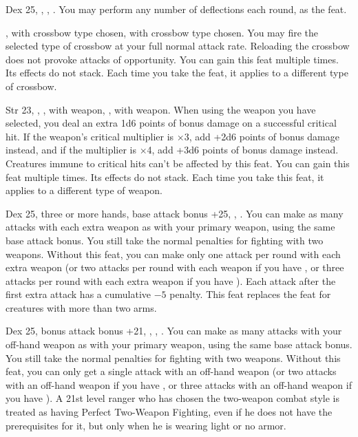 {Dex 25, , , .}
{You may perform any number of deflections each round, as the  feat.}

{}
{,  with crossbow type chosen,  with crossbow type chosen.}
{You may fire the selected type of crossbow at your full normal attack rate. Reloading the crossbow does not provoke attacks of opportunity.}
{}{You can gain this feat multiple times. Its effects do not stack. Each time you take the feat, it applies to a different type of crossbow.}

{}
{Str 23, , ,  with weapon, ,  with weapon.}
{When using the weapon you have selected, you deal an extra 1d6 points of bonus damage on a successful critical hit. If the weapon's critical multiplier is $\times$3, add +2d6 points of bonus damage instead, and if the multiplier is $\times$4, add +3d6 points of bonus damage instead. Creatures immune to critical hits can't be affected by this feat.}
{}{You can gain this feat multiple times. Its effects do not stack. Each time you take this feat, it applies to a different type of weapon.}


{}
{Dex 25, three or more hands, base attack bonus +25, , .}
{You can make as many attacks with each extra weapon as with your primary weapon, using the same base attack bonus. You still take the normal penalties for fighting with two weapons.}
{Without this feat, you can make only one attack per round with each extra weapon (or two attacks per round with each weapon if you have , or three attacks per round with each extra weapon if you have ). Each attack after the first extra attack has a cumulative $-5$ penalty.}
{This feat replaces the  feat for creatures with more than two arms.}

{}
{Dex 25, bonus attack bonus +21, , , .}
{You can make as many attacks with your off-hand weapon as with your primary weapon, using the same base attack bonus. You still take the normal penalties for fighting with two weapons.}
{Without this feat, you can only get a single attack with an off-hand weapon (or two attacks with an off-hand weapon if you have , or three attacks with an off-hand weapon if you have ).}
{A 21st level ranger who has chosen the two-weapon combat style is treated as having Perfect Two-Weapon Fighting, even if he does not have the prerequisites for it, but only when he is wearing light or no armor.}

